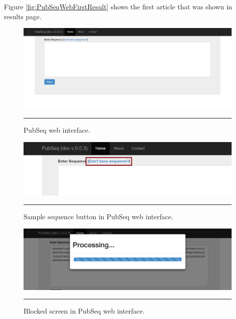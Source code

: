 Figure \ref{fig:PubSeqWebFirstResult} shows the first article that was shown in results page.

\begin{figure}[htbp]
    \includegraphics[width=6in]{Figures/pubseq_web.png}
    \rule{35em}{0.5pt}
  \caption[PubSeq Web Interface.]{PubSeq web interface.}
  \label{fig:PubSeqWebMain}
\end{figure}

\begin{figure}[htbp]
    \includegraphics[width=6in]{Figures/pubseq_web_sample_seq.png}
    \rule{35em}{0.5pt}
  \caption[Sample sequence button in PubSeq web interface.]{Sample sequence button in PubSeq web interface.}
  \label{fig:PubSeqWebSequence}
\end{figure}

\begin{figure}[htbp]
    \includegraphics[width=6in]{Figures/pubseq_blocked.png}
    \rule{35em}{0.5pt}
  \caption[Blocked screen in PubSeq web interface.]{Blocked screen in PubSeq web interface.}
  \label{fig:PubSeqWebBlocked}
\end{figure}

